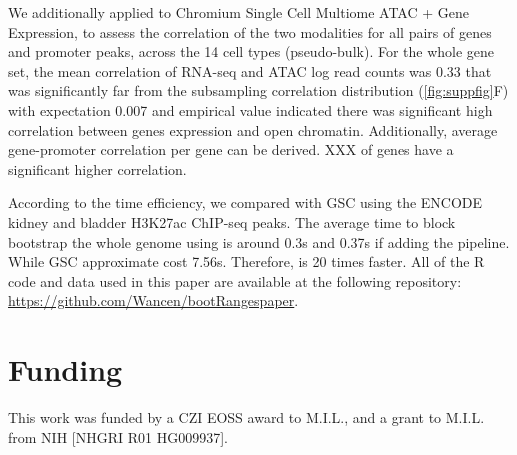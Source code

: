 We additionally applied
\bootranges to Chromium Single Cell Multiome ATAC + Gene Expression, to assess the correlation of the two modalities for all pairs of genes and promoter peaks, across the 14 cell types (pseudo-bulk).
For the whole gene set, the mean correlation of RNA-seq and ATAC log read counts was 0.33 that was significantly far from the subsampling correlation distribution (\cref{fig:suppfig}F) with expectation 0.007 and empirical value indicated there was significant high correlation between genes expression and open chromatin. Additionally, average gene-promoter correlation per gene can be derived. XXX of genes have a significant higher correlation. 


According to the time efficiency, we compared with GSC using the ENCODE kidney and bladder H3K27ac ChIP-seq peaks. The average time to block bootstrap the whole genome using \bootranges is around 0.3s and 0.37s if adding the \plyranges pipeline. While GSC approximate cost 7.56s. Therefore, \bootranges is 20 times faster.
All of the R code and data used in this paper are available at the following repository:
\url{https://github.com/Wancen/bootRangespaper}. 


  

\vspace*{-25pt}

\section*{Funding}
This work was funded by a CZI EOSS award to  M.I.L., and a grant to M.I.L. from NIH [NHGRI R01 HG009937].
